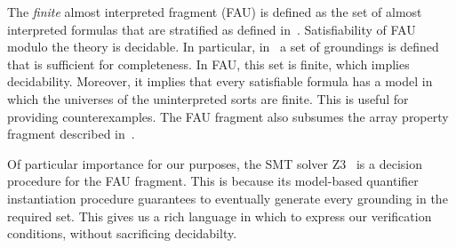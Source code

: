 The \emph{finite} almost interpreted fragment (FAU) is defined as the
set of almost interpreted formulas that are stratified as defined in~\cite{ge2009complete}. Satisfiability of FAU modulo the theory is decidable. In
particular, in~\cite{ge2009complete} a set of groundings is defined
that is sufficient for completeness. In FAU, this set is finite, which
implies decidability. Moreover, it implies that every satisfiable
formula has a model in which the universes of the uninterpreted sorts
are finite. This is useful for providing counterexamples. The FAU
fragment also subsumes the array property fragment described
in~\cite{BradleyManna}.

Of particular importance for our purposes, the SMT solver Z3~\cite{Z3} is a
decision procedure for the FAU fragment. This is because its
model-based quantifier instantiation procedure guarantees to
eventually generate every grounding in the required set. This gives us
a rich language in which to express our verification conditions,
without sacrificing decidabilty.



